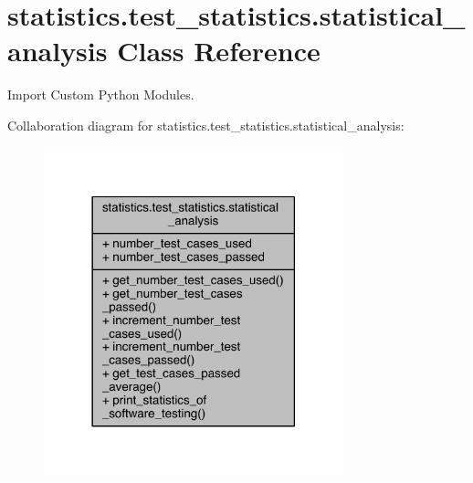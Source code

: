 \hypertarget{classstatistics_1_1test__statistics_1_1statistical__analysis}{}\section{statistics.\+test\+\_\+statistics.\+statistical\+\_\+analysis Class Reference}
\label{classstatistics_1_1test__statistics_1_1statistical__analysis}


Import Custom Python Modules.  




Collaboration diagram for statistics.\+test\+\_\+statistics.\+statistical\+\_\+analysis\+:
\nopagebreak
\begin{figure}[H]
\begin{center}
\leavevmode
\includegraphics[width=246pt]{dd/d6c/classstatistics_1_1test__statistics_1_1statistical__analysis__coll__graph}
\end{center}
\end{figure}
